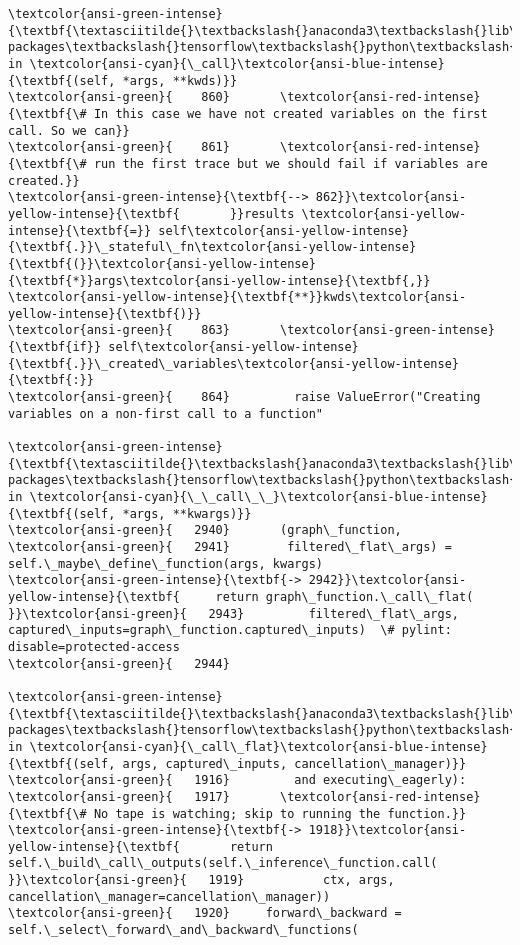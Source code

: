 \documentclass[11pt]{article}
\begin{document}
\begin{Verbatim}[commandchars=\\\{\}, frame=single, framerule=2mm, rulecolor=\color{outerrorbackground}]
\textcolor{ansi-green-intense}{\textbf{\textasciitilde{}\textbackslash{}anaconda3\textbackslash{}lib\textbackslash{}site-packages\textbackslash{}tensorflow\textbackslash{}python\textbackslash{}eager\textbackslash{}def\_function.py}} in \textcolor{ansi-cyan}{\_call}\textcolor{ansi-blue-intense}{\textbf{(self, *args, **kwds)}}
\textcolor{ansi-green}{    860}       \textcolor{ansi-red-intense}{\textbf{\# In this case we have not created variables on the first call. So we can}}
\textcolor{ansi-green}{    861}       \textcolor{ansi-red-intense}{\textbf{\# run the first trace but we should fail if variables are created.}}
\textcolor{ansi-green-intense}{\textbf{--> 862}}\textcolor{ansi-yellow-intense}{\textbf{       }}results \textcolor{ansi-yellow-intense}{\textbf{=}} self\textcolor{ansi-yellow-intense}{\textbf{.}}\_stateful\_fn\textcolor{ansi-yellow-intense}{\textbf{(}}\textcolor{ansi-yellow-intense}{\textbf{*}}args\textcolor{ansi-yellow-intense}{\textbf{,}} \textcolor{ansi-yellow-intense}{\textbf{**}}kwds\textcolor{ansi-yellow-intense}{\textbf{)}}
\textcolor{ansi-green}{    863}       \textcolor{ansi-green-intense}{\textbf{if}} self\textcolor{ansi-yellow-intense}{\textbf{.}}\_created\_variables\textcolor{ansi-yellow-intense}{\textbf{:}}
\textcolor{ansi-green}{    864}         raise ValueError("Creating variables on a non-first call to a function"

\textcolor{ansi-green-intense}{\textbf{\textasciitilde{}\textbackslash{}anaconda3\textbackslash{}lib\textbackslash{}site-packages\textbackslash{}tensorflow\textbackslash{}python\textbackslash{}eager\textbackslash{}function.py}} in \textcolor{ansi-cyan}{\_\_call\_\_}\textcolor{ansi-blue-intense}{\textbf{(self, *args, **kwargs)}}
\textcolor{ansi-green}{   2940}       (graph\_function,
\textcolor{ansi-green}{   2941}        filtered\_flat\_args) = self.\_maybe\_define\_function(args, kwargs)
\textcolor{ansi-green-intense}{\textbf{-> 2942}}\textcolor{ansi-yellow-intense}{\textbf{     return graph\_function.\_call\_flat(
}}\textcolor{ansi-green}{   2943}         filtered\_flat\_args, captured\_inputs=graph\_function.captured\_inputs)  \# pylint: disable=protected-access
\textcolor{ansi-green}{   2944} 

\textcolor{ansi-green-intense}{\textbf{\textasciitilde{}\textbackslash{}anaconda3\textbackslash{}lib\textbackslash{}site-packages\textbackslash{}tensorflow\textbackslash{}python\textbackslash{}eager\textbackslash{}function.py}} in \textcolor{ansi-cyan}{\_call\_flat}\textcolor{ansi-blue-intense}{\textbf{(self, args, captured\_inputs, cancellation\_manager)}}
\textcolor{ansi-green}{   1916}         and executing\_eagerly):
\textcolor{ansi-green}{   1917}       \textcolor{ansi-red-intense}{\textbf{\# No tape is watching; skip to running the function.}}
\textcolor{ansi-green-intense}{\textbf{-> 1918}}\textcolor{ansi-yellow-intense}{\textbf{       return self.\_build\_call\_outputs(self.\_inference\_function.call(
}}\textcolor{ansi-green}{   1919}           ctx, args, cancellation\_manager=cancellation\_manager))
\textcolor{ansi-green}{   1920}     forward\_backward = self.\_select\_forward\_and\_backward\_functions(


\end{Verbatim}
\end{document}
